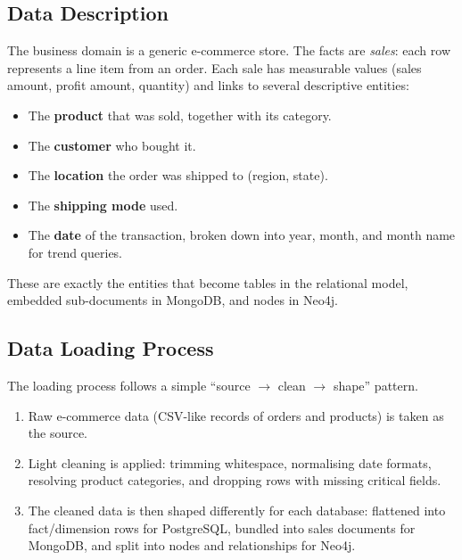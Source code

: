 \documentclass[11pt,a4paper]{article}
\begin{document}
\subsection{Data Description}

The business domain is a generic e-commerce store. The facts are
\emph{sales}: each row represents a line item from an order. Each sale has
measurable values (sales amount, profit amount, quantity) and links to
several descriptive entities:

\begin{itemize}[leftmargin=*]
    \item The \textbf{product} that was sold, together with its category.
    \item The \textbf{customer} who bought it.
    \item The \textbf{location} the order was shipped to (region, state).
    \item The \textbf{shipping mode} used.
    \item The \textbf{date} of the transaction, broken down into year,
          month, and month name for trend queries.
\end{itemize}

These are exactly the entities that become tables in the relational model,
embedded sub-documents in MongoDB, and nodes in Neo4j.

\subsection{Data Loading Process}

The loading process follows a simple ``source $\rightarrow$ clean $\rightarrow$
shape'' pattern.

\begin{enumerate}[leftmargin=*]
    \item Raw e-commerce data (CSV-like records of orders and products) is
          taken as the source.
    \item Light cleaning is applied: trimming whitespace, normalising date
          formats, resolving product categories, and dropping rows with
          missing critical fields.
    \item The cleaned data is then shaped differently for each database:
          flattened into fact/dimension rows for PostgreSQL, bundled into
          sales documents for MongoDB, and split into nodes and
          relationships for Neo4j.
\end{enumerate}
\end{document}
